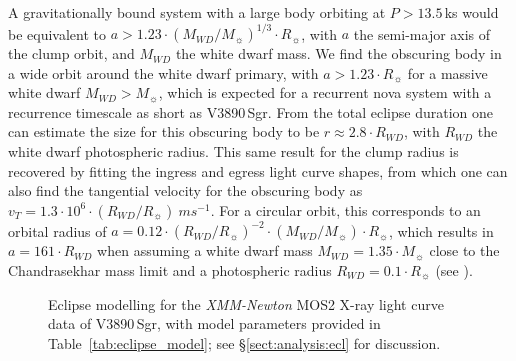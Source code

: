 \documentclass{aa}
\begin{document}
A gravitationally bound system with a large body orbiting at
$P > 13.5$\,ks would be
equivalent to $a>1.23 \cdot ({M_{WD}/M_\sun})^{1/3} \cdot R_\sun$, with
$a$ the semi-major axis of the clump orbit, and $M_{WD}$ the white
dwarf mass. We find the obscuring body in a wide orbit around the white
dwarf primary, with $a > 1.23\cdot R_\sun$ for a massive white dwarf
$M_{WD} >  M_\sun$, which is expected for a recurrent nova system with
a recurrence timescale as short as V3890\,Sgr. From the total eclipse
duration one can estimate the size for this obscuring body to be
$r \approx 2.8 \cdot R_{WD}$, with $R_{WD}$ the white dwarf photospheric
radius. This same result for the clump radius is recovered by fitting
the ingress and egress light curve shapes, from which one can also find
the tangential velocity for the obscuring body as
$v_T = 1.3 \cdot 10^{6} \cdot (R_{WD}/R_\sun)\ ms^{-1}$. 
For a circular orbit, this corresponds to an orbital radius of
$a=0.12 \cdot (R_{WD}/R_\sun)^{-2} \cdot (M_{WD}/M_\sun) \cdot R_\sun$,
which results in $a=161 \cdot R_{WD}$ when assuming a white dwarf mass
$M_{WD}=1.35\cdot M_\sun$ close to the Chandrasekhar mass limit and
a photospheric radius $R_{WD}=0.1 \cdot R_\sun$ (see \citealt{page20}).

\begin{figure}[!ht]
 \caption{Eclipse modelling for the \emph{XMM-Newton} MOS2 X-ray light curve data of V3890\,Sgr, with model parameters provided in Table~\ref{tab:eclipse_model}; see \S\ref{sect:analysis:ecl} for discussion.
 }
 \label{fig:eclipse_model}
\end{figure}
\end{document}
